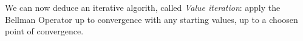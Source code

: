 We can now deduce an iterative algorith, called \emph{Value iteration}: apply the Bellman Operator up to convergence with any starting values, up to a choosen point of convergence.






































